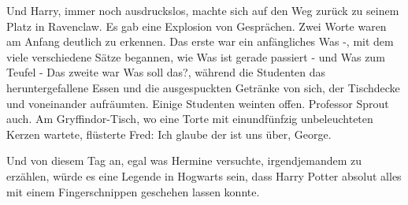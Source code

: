 Und Harry, immer noch ausdruckslos, machte sich auf den Weg zurück zu seinem
Platz in Ravenclaw. Es gab eine Explosion von Gesprächen. Zwei Worte waren am
Anfang deutlich zu erkennen. Das erste war ein anfängliches \glqq{}Was -\grqq{},
mit dem viele verschiedene Sätze begannen, wie \glqq{}Was ist gerade passiert
-\grqq{} und \glqq{}Was zum Teufel -\grqq{} Das zweite war \glqq{}Was soll
das?\grqq{}, während die Studenten das heruntergefallene Essen und die
ausgespuckten Getränke von sich, der Tischdecke und voneinander aufräumten.
Einige Studenten weinten offen. Professor Sprout auch. Am Gryffindor-Tisch, wo
eine Torte mit einundfünfzig unbeleuchteten Kerzen wartete, flüsterte Fred:
\glqq{}Ich glaube der ist uns über, George.\grqq{}

Und von diesem Tag an, egal was Hermine versuchte, irgendjemandem zu erzählen,
würde es eine Legende in Hogwarts sein, dass Harry Potter absolut alles mit
einem Fingerschnippen geschehen lassen konnte.